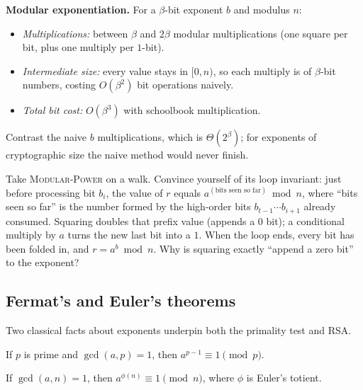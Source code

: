 \begin{complexitybox}
\textbf{Modular exponentiation.} For a $\beta$-bit exponent $b$ and modulus $n$:
\begin{itemize}
  \item \emph{Multiplications:} between $\beta$ and $2\beta$ modular
        multiplications (one square per bit, plus one multiply per $1$-bit).
  \item \emph{Intermediate size:} every value stays in $[0,n)$, so each multiply
        is of $\beta$-bit numbers, costing $O(\beta^2)$ bit operations naively.
  \item \emph{Total bit cost:} $O(\beta^3)$ with schoolbook multiplication.
\end{itemize}
Contrast the naive $b$ multiplications, which is $\Theta(2^{\beta})$; for
exponents of cryptographic size the naive method would never finish.
\end{complexitybox}

\begin{walkbox}
Take \textsc{Modular-Power} on a walk. Convince yourself of its loop invariant:
just before processing bit $b_i$, the value of $r$ equals $a^{(\text{bits seen so
far})} \bmod n$, where ``bits seen so far'' is the number formed by the
high-order bits $b_{t-1}\cdots b_{i+1}$ already consumed. Squaring doubles that
prefix value (appends a $0$ bit); a conditional multiply by $a$ turns the new
last bit into a $1$. When the loop ends, every bit has been folded in, and $r =
a^b \bmod n$. Why is squaring exactly ``append a zero bit'' to the exponent?
\end{walkbox}

\subsection{Fermat's and Euler's theorems}

Two classical facts about exponents underpin both the primality test and RSA.

\begin{theorem}
\label{ch30:thm-fermat}
If $p$ is prime and $\gcd(a,p) = 1$, then $a^{p-1} \equiv 1 \pmod p$.
\end{theorem}

\begin{theorem}
\label{ch30:thm-euler}
If $\gcd(a,n) = 1$, then $a^{\phi(n)} \equiv 1 \pmod n$, where $\phi$ is Euler's
totient.
\end{theorem}


